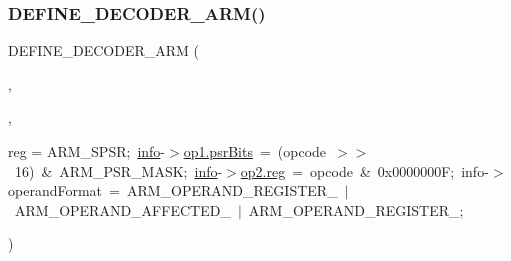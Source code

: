 \mbox{\label{decoder-arm_8c_a84d8d1555643e38f9f04a47e47d84a23}} 
\subsubsection{\texorpdfstring{D\+E\+F\+I\+N\+E\+\_\+\+D\+E\+C\+O\+D\+E\+R\+\_\+\+A\+R\+M()}{DEFINE\_DECODER\_ARM()}\hspace{0.1cm}{\footnotesize\ttfamily [4/6]}}
{\footnotesize\ttfamily D\+E\+F\+I\+N\+E\+\_\+\+D\+E\+C\+O\+D\+E\+R\+\_\+\+A\+RM (\begin{DoxyParamCaption}\item[{M\+S\+RR}]{,  }\item[{\mbox{\hyperlink{decoder-arm_8c_ad9c5d760c45ba502ddfe54752058d02e}{M\+SR}}}]{,  }\item[{\mbox{\hyperlink{libretro_8h_a283ad41e4809f9c0ebe736a9861d8a91}{info}}-\/$>$op1.}]{reg = {\ttfamily ARM\+\_\+SPSR;~\mbox{\hyperlink{libretro_8h_a283ad41e4809f9c0ebe736a9861d8a91}{info}}-\/$>$\mbox{\hyperlink{decoder-arm_8c_a69eccd10e3446c8069693353639ba059}{op1.\+psr\+Bits}}~=~(opcode~$>$$>$~16)~\&~ARM\+\_\+PSR\+\_\+MASK;~\mbox{\hyperlink{libretro_8h_a283ad41e4809f9c0ebe736a9861d8a91}{info}}-\/$>$\mbox{\hyperlink{lr35902_2decoder_8c_af44c02f7785479603f59b662f3dfae6a}{op2.\+reg}}~=~opcode~\&~0x0000000F;~info-\/$>$operandFormat~=~ARM\+\_\+OPERAND\+\_\+REGISTER\+\_~$\vert$~ARM\+\_\+OPERAND\+\_\+AFFECTED\+\_~$\vert$~ARM\+\_\+OPERAND\+\_\+REGISTER\+\_;} }\end{DoxyParamCaption})}

\mbox{\label{decoder-arm_8c_a806ab4e8f05768b1189a0c989ecdcd76}} 
